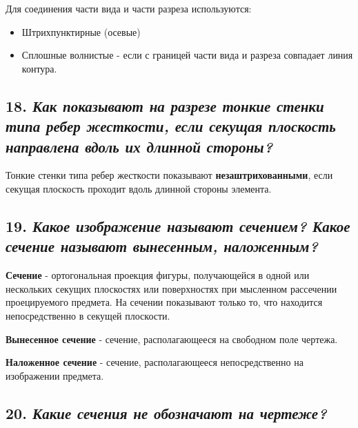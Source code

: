 Для соединения части вида и части разреза используются:
\begin{itemize}

\item Штрихпунктирные (осевые)



\item Сплошные волнистые - если с границей части вида и разреза совпадает линия контура.




\end{itemize}
\subsection*{18. \textit{Как показывают на разрезе тонкие стенки типа ребер жесткости, если секущая плоскость направлена вдоль их длинной стороны?}}

Тонкие стенки типа ребер жесткости показывают \textbf{незаштрихованными}, если секущая плоскость проходит вдоль длинной стороны элемента.



\subsection*{19. \textit{Какое изображение называют сечением? Какое сечение называют вынесенным, наложенным?}}

\textbf{Сечение} - ортогональная проекция фигуры, получающейся в одной или нескольких секущих плоскостях или поверхностях при мысленном рассечении проецируемого предмета. На сечении показывают только то, что находится непосредственно в секущей плоскости.

\textbf{Вынесенное сечение} - сечение, располагающееся на свободном поле чертежа.

\textbf{Наложенное сечение} - сечение, располагающееся непосредственно на изображении предмета.



\subsection*{20. \textit{Какие сечения не обозначают на чертеже?}}

